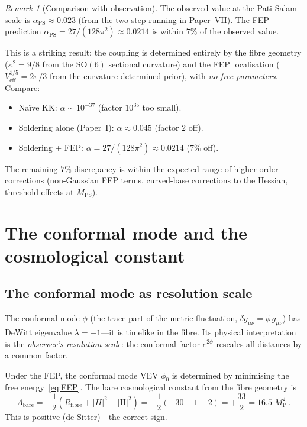 \documentclass[12pt, a4paper]{article}
\theoremstyle{definition}
\theoremstyle{remark}
\newtheorem{remark}[theorem]{Remark}
\newcommand{\SO}{\mathrm{SO}}
\newcommand{\Veff}{V_{\mathrm{eff}}}
\newcommand{\MPS}{M_{\mathrm{PS}}}
\newcommand{\MP}{M_{\mathrm{P}}}
\newcommand{\aPS}{\alpha_{\mathrm{PS}}}
\newcommand{\Rfibre}{R_{\mathrm{fibre}}}
\begin{document}
\begin{remark}[Comparison with observation]
The observed value at the Pati-Salam scale is $\aPS \approx 0.023$ (from the two-step running in Paper~VII).
The FEP prediction $\aPS = 27/(128\pi^2) \approx 0.0214$ is within $7\%$ of the observed value.

This is a striking result: the coupling is determined entirely by the fibre geometry ($\kappa^2 = 9/8$ from the $\SO(6)$ sectional curvature) and the FEP localisation ($\Veff^{1/5} = 2\pi/3$ from the curvature-determined prior), with \emph{no free parameters}.
Compare:
\begin{itemize}[nosep]
\item Na\"ive KK: $\alpha \sim 10^{-37}$ (factor $10^{35}$ too small).
\item Soldering alone (Paper~I): $\alpha \approx 0.045$ (factor $2$ off).
\item Soldering + FEP: $\alpha = 27/(128\pi^2) \approx 0.0214$ ($7\%$ off).
\end{itemize}
The remaining $7\%$ discrepancy is within the expected range of higher-order corrections (non-Gaussian FEP terms, curved-base corrections to the Hessian, threshold effects at $\MPS$).
\end{remark}


\section{The conformal mode and the cosmological constant}
\label{sec:conformal}

\subsection{The conformal mode as resolution scale}

The conformal mode $\phi$ (the trace part of the metric fluctuation, $\delta g_{\mu\nu} = \phi\, g_{\mu\nu}$) has DeWitt eigenvalue $\lambda = -1$---it is timelike in the fibre.
Its physical interpretation is the \emph{observer's resolution scale}: the conformal factor $e^{2\phi}$ rescales all distances by a common factor.

Under the FEP, the conformal mode VEV $\phi_0$ is determined by minimising the free energy~\eqref{eq:FEP}.
The bare cosmological constant from the fibre geometry is~\cite{Paper1}
\begin{equation}
\Lambda_{\mathrm{bare}} = -\frac{1}{2}\left(\Rfibre + |H|^2 - |\mathrm{I\!I}|^2\right) = -\frac{1}{2}(-30 - 1 - 2) = +\frac{33}{2} = 16.5\; \MP^2\,.
\end{equation}
This is positive (de Sitter)---the correct sign.
\end{document}
